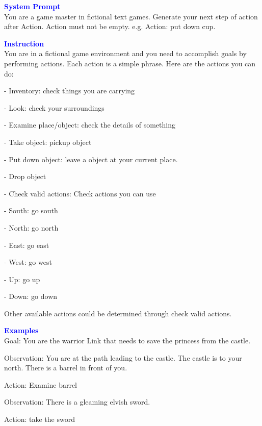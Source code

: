 \begin{tcolorbox}[breakable,title=Prompt Details for Jericho ]
\textbf{\textcolor{blue}{System Prompt}}\\ 
You are a game master in fictional text games. Generate your next step of action after Action. Action must not be empty. e.g. Action: put down cup.\\
\textbf{\textcolor{blue}{Instruction}}\\
You are in a fictional game environment and you need to accomplish goals by performing actions. Each action is a simple phrase. Here are the actions you can do: 

- Inventory: check things you are carrying

- Look: check your surroundings

- Examine place/object: check the details of something

- Take object: pickup object

- Put down object: leave a object at your current place.

- Drop object

- Check valid actions: Check actions you can use

- South: go south

- North: go north

- East: go east

- West: go west

- Up: go up

- Down: go down

Other available actions could be determined through check valid actions.

\textbf{\textcolor{blue}{Examples}}\\
Goal: You are the warrior Link that needs to save the princess from the castle.

Observation: You are at the path leading to the castle. The castle is to your north. There is a barrel in front of you. 

Action: Examine barrel

Observation: There is a gleaming elvish sword. 

Action: take the sword


\end{tcolorbox}
